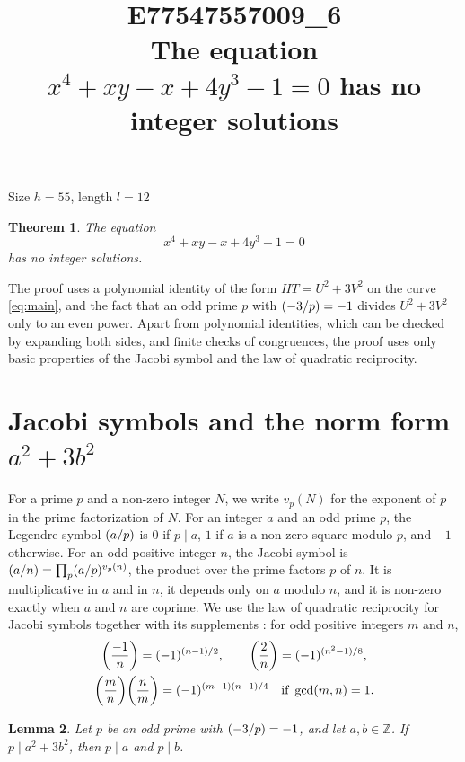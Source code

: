\documentclass[11pt]{article}
\title{\textbf{E77547557009\_6}\\[4pt] {\Large The equation $x^{4}+xy-x+4y^{3}-1=0$ has no integer solutions}}
\author{}
\date{}
\newtheorem{theorem}{Theorem}
\newtheorem{lemma}[theorem]{Lemma}
\newcommand{\Z}{\mathbb{Z}}
\newcommand{\leg}[2]{\mathchoice{\biggl(\dfrac{#1}{#2}\biggr)}{(#1/#2)}{(#1/#2)}{(#1/#2)}}
\begin{document}
\maketitle
\vspace{-8ex}
\begin{center}
Size $h=55$, length $l=12$
\end{center}

\begin{theorem}\label{thm:main}
The equation
\begin{equation}\label{eq:main}
x^{4}+xy-x+4y^{3}-1=0
\end{equation}
has no integer solutions.
\end{theorem}

The proof uses a polynomial identity of the form $HT=U^2+3V^2$ on the curve \eqref{eq:main}, and the fact that an odd prime $p$ with $\leg{-3}{p}=-1$ divides $U^2+3V^2$ only to an even power. Apart from polynomial identities, which can be checked by expanding both sides, and finite checks of congruences, the proof uses only basic properties of the Jacobi symbol and the law of quadratic reciprocity.

\section{\texorpdfstring{Jacobi symbols and the norm form $a^2+3b^2$}{Jacobi symbols and the norm form}}

For a prime $p$ and a non-zero integer $N$, we write $v_p(N)$ for the exponent of $p$ in the prime factorization of $N$. For an integer $a$ and an odd prime $p$, the Legendre symbol $\leg{a}{p}$ is $0$ if $p\mid a$, $1$ if $a$ is a non-zero square modulo $p$, and $-1$ otherwise. For an odd positive integer $n$, the Jacobi symbol is $\leg{a}{n}=\prod_p\leg{a}{p}^{v_p(n)}$, the product over the prime factors $p$ of $n$. It is multiplicative in $a$ and in $n$, it depends only on $a$ modulo $n$, and it is non-zero exactly when $a$ and $n$ are coprime. We use the law of quadratic reciprocity for Jacobi symbols together with its supplements \cite[Chapter~5, \S2]{IR}: for odd positive integers $m$ and $n$,
\begin{gather*}
\leg{-1}{n}=(-1)^{(n-1)/2},\qquad\leg{2}{n}=(-1)^{(n^2-1)/8},\\
\leg{m}{n}\leg{n}{m}=(-1)^{(m-1)(n-1)/4}\quad\text{if }\gcd(m,n)=1.
\end{gather*}

\begin{lemma}\label{lem:divides}
Let $p$ be an odd prime with $\leg{-3}{p}=-1$, and let $a,b\in\Z$. If $p\mid a^2+3b^2$, then $p\mid a$ and $p\mid b$.
\end{lemma}
\end{document}
